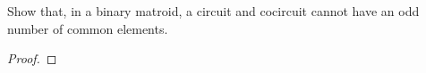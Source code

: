 \prob
{
    Show that, in a binary matroid, a circuit and cocircuit cannot have an odd number of common elements.
}
\begin{proof}
\end{proof}